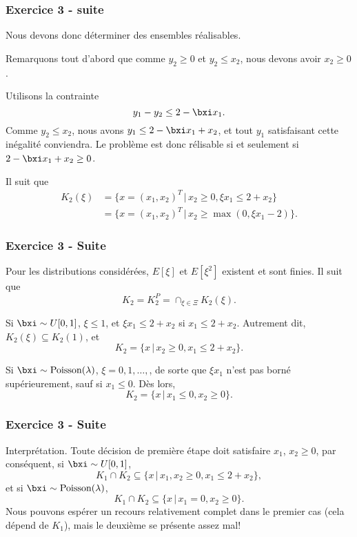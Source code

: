 \begin{frame}
	\frametitle{Exercice 3 - suite}
	
	Nous devons donc déterminer des ensembles réalisables.
	
	\mbox{}
	
	Remarquons tout d'abord que comme $y_2 \geq 0$ et $y_2 \leq x_2$, nous
	devons avoir $x_2 \geq 0$.
	
	\mbox{}
	
	Utilisons la contrainte
	\[
	y_1 - y_2 \leq 2-\bxi x_1.
	\]
	Comme $y_2 \leq x_2$, nous avons $y_1 \leq 2-\bxi x_1 + x_2$, et tout
	$y_1$ satisfaisant cette inégalité conviendra. Le
	problème est donc rélisable si et seulement si $2-\bxi x_1 + x_2 \geq 0$.
	
	Il suit que
	\begin{align*}
	K_2(\xi) &= \lbrace x = (x_1, x_2)^T \,|\, x_2 \geq 0, \xi x_1 \leq
	2+x_2 \rbrace \\
	&= \lbrace  x = (x_1, x_2)^T \,|\, x_2 \geq \max(0, \xi x_1 -2 ) \rbrace.
	\end{align*}
	
\end{frame}

\begin{frame}
	\frametitle{Exercice 3 - Suite}
	
	Pour les distributions considérées, $E[\xi]$ et $E[\xi^2]$ existent et
	sont finies. Il suit que
	\[
	K_2 = K_2^P = \cap_{\xi \in \Xi} K_2(\xi).
	\]
	
	\mbox{}
	
	Si $\bxi \sim U[0,1]$, $\xi \leq 1$, et $\xi x_1 \leq 2 + x_2$ si $x_1
	\leq 2 + x_2$. Autrement dit, $K_2(\xi) \subseteq K_2(1)$, et
	\[
	K_2 = \lbrace x \,|\, x_2 \geq 0, x_1 \leq 2 + x_2 \rbrace.
	\]
	
	\mbox{}
	
	Si $\bxi \sim \mbox{Poisson}(\lambda)$, $\xi = 0, 1,\ldots,$, de sorte
	que $\xi x_1$ n'est pas borné supérieurement, sauf si $x_1 \leq
	0$. Dès lors,
	\[
	K_2 = \lbrace x \,|\, x_1 \leq 0, x_2 \geq 0 \rbrace.
	\]
	
\end{frame}

\begin{frame}
	\frametitle{Exercice 3 - Suite}
	
	Interprétation. Toute décision de première étape doit satisfaire
	$x_1$, $x_2 \geq 0$, par conséquent, si $\bxi \sim U[0,1]$,
	\[
	K_1 \cap K_2 \subseteq \lbrace x \,|\, x_1, x_2 \geq 0, x_1 \leq 2+x_2
	\rbrace,
	\]
	et si $\bxi \sim \mbox{Poisson}(\lambda)$,
	\[
	K_1 \cap K_2 \subseteq \lbrace x \,|\, x_1 = 0, x_2 \geq 0 \rbrace.
	\]
	Nous pouvons espérer un recours relativement complet dans le premier
	cas (cela dépend de $K_1$), mais le deuxième se présente assez mal!
	
\end{frame}


